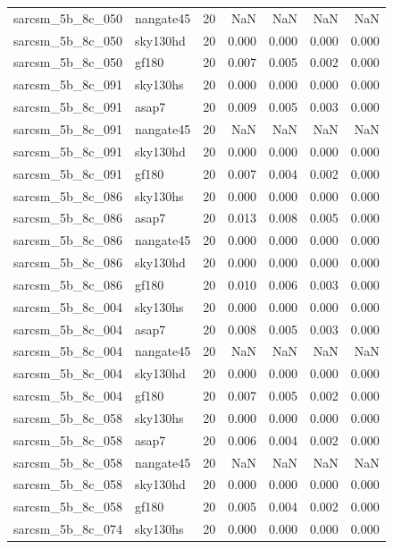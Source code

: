 \begin{tabular}{llrrrrr}
sarcsm\_5b\_8c\_050 & nangate45 & 20 & NaN & NaN & NaN & NaN \\
sarcsm\_5b\_8c\_050 & sky130hd & 20 & 0.000 & 0.000 & 0.000 & 0.000 \\
sarcsm\_5b\_8c\_050 & gf180 & 20 & 0.007 & 0.005 & 0.002 & 0.000 \\
sarcsm\_5b\_8c\_091 & sky130hs & 20 & 0.000 & 0.000 & 0.000 & 0.000 \\
sarcsm\_5b\_8c\_091 & asap7 & 20 & 0.009 & 0.005 & 0.003 & 0.000 \\
sarcsm\_5b\_8c\_091 & nangate45 & 20 & NaN & NaN & NaN & NaN \\
sarcsm\_5b\_8c\_091 & sky130hd & 20 & 0.000 & 0.000 & 0.000 & 0.000 \\
sarcsm\_5b\_8c\_091 & gf180 & 20 & 0.007 & 0.004 & 0.002 & 0.000 \\
sarcsm\_5b\_8c\_086 & sky130hs & 20 & 0.000 & 0.000 & 0.000 & 0.000 \\
sarcsm\_5b\_8c\_086 & asap7 & 20 & 0.013 & 0.008 & 0.005 & 0.000 \\
sarcsm\_5b\_8c\_086 & nangate45 & 20 & 0.000 & 0.000 & 0.000 & 0.000 \\
sarcsm\_5b\_8c\_086 & sky130hd & 20 & 0.000 & 0.000 & 0.000 & 0.000 \\
sarcsm\_5b\_8c\_086 & gf180 & 20 & 0.010 & 0.006 & 0.003 & 0.000 \\
sarcsm\_5b\_8c\_004 & sky130hs & 20 & 0.000 & 0.000 & 0.000 & 0.000 \\
sarcsm\_5b\_8c\_004 & asap7 & 20 & 0.008 & 0.005 & 0.003 & 0.000 \\
sarcsm\_5b\_8c\_004 & nangate45 & 20 & NaN & NaN & NaN & NaN \\
sarcsm\_5b\_8c\_004 & sky130hd & 20 & 0.000 & 0.000 & 0.000 & 0.000 \\
sarcsm\_5b\_8c\_004 & gf180 & 20 & 0.007 & 0.005 & 0.002 & 0.000 \\
sarcsm\_5b\_8c\_058 & sky130hs & 20 & 0.000 & 0.000 & 0.000 & 0.000 \\
sarcsm\_5b\_8c\_058 & asap7 & 20 & 0.006 & 0.004 & 0.002 & 0.000 \\
sarcsm\_5b\_8c\_058 & nangate45 & 20 & NaN & NaN & NaN & NaN \\
sarcsm\_5b\_8c\_058 & sky130hd & 20 & 0.000 & 0.000 & 0.000 & 0.000 \\
sarcsm\_5b\_8c\_058 & gf180 & 20 & 0.005 & 0.004 & 0.002 & 0.000 \\
sarcsm\_5b\_8c\_074 & sky130hs & 20 & 0.000 & 0.000 & 0.000 & 0.000 \\

\end{tabular}
